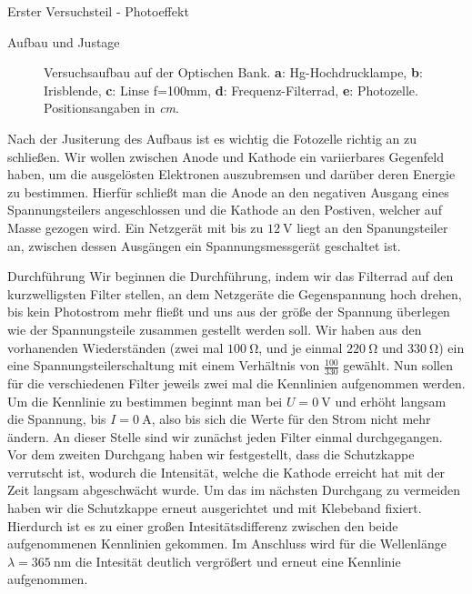 \documentclass[pdftex, a4paper,11pt, twoside, ngerman]{report}
\begin{document}
\begin{chapter}{Erster Versuchsteil - Photoeffekt}
\begin{section}{Aufbau und Justage}
\begin{figure}[htbp]
\begin{center}
          \caption{Versuchsaufbau auf der Optischen Bank. \textbf{a}:
              Hg-Hochdrucklampe, \textbf{b}: Irisblende,  \textbf{c}: Linse 
              f=100mm, \textbf{d}: Frequenz-Filterrad, \textbf{e}: Photozelle. 
              Positionsangaben in \textit{cm}. \cite{bib:LDDidactic}}
          \label{fig:Planckaufbau}
        \end{center}
      \end{figure}
      Nach der Jusiterung des Aufbaus ist es wichtig die Fotozelle richtig an
      zu schließen. Wir wollen zwischen Anode und Kathode ein variierbares 
      Gegenfeld haben, um die ausgelösten Elektronen auszubremsen und darüber 
      deren Energie zu bestimmen. Hierfür schließt man die Anode an den 
      negativen Ausgang eines Spannungsteilers angeschlossen und die Kathode 
      an den Postiven, welcher auf Masse gezogen wird. Ein Netzgerät mit bis 
      zu $\SI{12}{\volt}$ liegt an den Spanungsteiler an, zwischen dessen 
      Ausgängen ein Spannungsmessgerät geschaltet ist.
      
    \end{section}
    
    
    
    \begin{section}{Durchführung}
      \label{chp:Aufbau:sec:ERSTERTEIL:subsec:UNTERTEIL}
      Wir beginnen die Durchführung, indem wir das Filterrad auf den
      kurzwelligsten Filter stellen, an dem Netzgeräte die Gegenspannung hoch 
      drehen, bis kein Photostrom mehr fließt und uns aus der größe der 
      Spannung überlegen wie der Spannungsteile zusammen gestellt werden soll. 
      Wir haben aus den vorhanenden Wiederständen (zwei mal $\SI{100}{\ohm}$, 
      und je einmal $\SI{220}{\ohm}$ und $\SI{330}{\ohm}$) ein eine 
      Spannungsteilerschaltung mit einem Verhältnis von $\frac{100}{330}$ 
      gewählt. Nun sollen für die verschiedenen Filter jeweils zwei mal die 
      Kennlinien aufgenommen werden.
      Um die Kennlinie zu bestimmen beginnt man bei $U=\SI{0}{\volt}$ und
      erhöht langsam die Spannung, bis $I=\SI{0}{\ampere}$, also bis sich die 
      Werte für den Strom nicht mehr ändern. An dieser Stelle sind wir 
      zunächst jeden Filter einmal durchgegangen. Vor dem zweiten Durchgang 
      haben wir festgestellt, dass die Schutzkappe verrutscht ist, wodurch die 
      Intensität, welche die Kathode erreicht hat mit der Zeit langsam 
      abgeschwächt wurde. Um das im nächsten Durchgang zu vermeiden haben wir 
      die Schutzkappe erneut ausgerichtet und mit Klebeband fixiert. Hierdurch 
      ist es zu einer großen Intesitätsdifferenz zwischen den beide 
      aufgenommenen Kennlinien gekommen. Im Anschluss wird für die Wellenlänge 
      $\lambda = \SI{365}{\nano\meter}$ die Intesität deutlich vergrößert und 
      erneut eine Kennlinie aufgenommen.  


\end{section}
\end{chapter}
\end{document}
